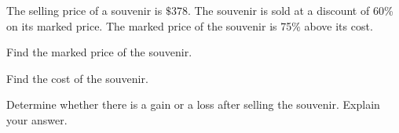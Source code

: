 
The selling price of a souvenir is $\$378$. The souvenir is sold at a discount of 60\% on its marked price. The marked price of the souvenir is 75\% above its cost.

\begin{enumx}[label=(\alph*)]
	\item Find the marked price of the souvenir.
    \item Find the cost of the souvenir.
    \item Determine whether there is a gain or a loss after selling the souvenir. Explain your answer.
\end{enumx}




